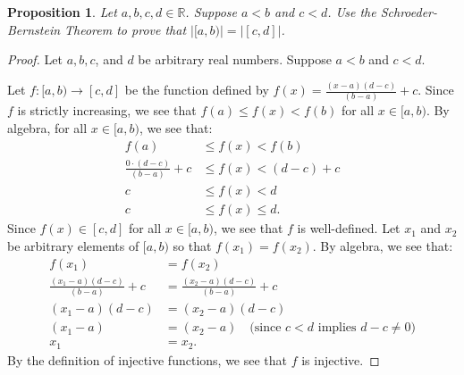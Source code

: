 \documentclass{amsart}
\newtheorem*{proposition}{Proposition}
\newcommand{\abs}[1]{\left|#1\right|}
\newcommand{\R}{\mathbb{R}}
\numberwithin{equation}{section}
\begin{document}
	\begin{problem}[manual-num=66]
		\begin{proposition}
			Let $a, b, c, d \in \R$.
			Suppose $a < b$ and $c < d$.
			Use the Schroeder-Bernstein Theorem to prove that $\abs{[a, b)} = \abs{[c, d]}$.
		\end{proposition}

		\begin{proof}
			Let $a, b, c$, and $d$ be arbitrary real numbers.
			Suppose $a < b$ and $c < d$.

			Let $f : [a, b) \rightarrow [c, d]$ be the function defined by $f(x) = \frac{(x - a)(d - c)}{(b - a)} + c$.
			Since $f$ is strictly increasing, we see that $f(a) \leq f(x) < f(b)$ for all $x \in [a, b)$.
			By algebra, for all $x \in [a, b)$, we see that:
			\begin{align*}
				f(a) &\leq f(x) < f(b) \\
				\frac{0 \cdot (d - c)}{(b - a)} + c &\leq f(x) < (d - c) + c \\
				c &\leq f(x) < d \\
				c &\leq f(x) \leq d.
			\end{align*}
			Since $f(x) \in [c, d]$ for all $x \in [a, b)$, we see that $f$ is well-defined.
			Let $x_1$ and $x_2$ be arbitrary elements of $[a, b)$ so that $f(x_1) = f(x_2)$.
			By algebra, we see that:
			\begin{align*}
				f(x_1) &= f(x_2) \\
				\frac{(x_1 - a)(d - c)}{(b - a)} + c &= \frac{(x_2 - a)(d - c)}{(b - a)} + c \\
				(x_1 - a)(d - c) &= (x_2 - a)(d - c) \\
				(x_1 - a) &= (x_2 - a) \quad \text{(since $c < d$ implies $d - c \neq 0)$} \\
				x_1 &= x_2.
			\end{align*}
			By the definition of injective functions, we see that $f$ is injective.


\end{proof}
\end{problem}
\end{document}
